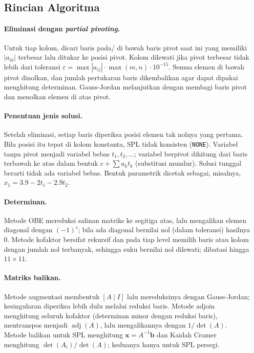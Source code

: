 \documentclass[12pt,a4paper]{article}
\newcommand{\mat}[1]{\mathbf{#1}}
\DeclareMathOperator{\adj}{adj}
\begin{document}
\subsection{Rincian Algoritma}

\paragraph{Eliminasi dengan \textit{partial pivoting}.} Untuk tiap kolom, dicari baris pada/ di bawah baris pivot saat ini yang memiliki $|a_{ik}|$ terbesar lalu ditukar ke posisi pivot. Kolom dilewati jika pivot terbesar tidak lebih dari toleransi $\varepsilon=\max|a_{ij}|\cdot\max(m,n)\cdot10^{-15}$. Semua elemen di bawah pivot dinolkan, dan jumlah pertukaran baris dikembalikan agar dapat dipakai menghitung determinan. Gauss-Jordan melanjutkan dengan membagi baris pivot dan menolkan elemen di atas pivot.

\paragraph{Penentuan jenis solusi.} Setelah eliminasi, setiap baris diperiksa posisi elemen tak nolnya yang pertama. Bila posisi itu tepat di kolom konstanta, SPL tidak konsisten (\texttt{NONE}). Variabel tanpa pivot menjadi variabel bebas $t_1,t_2,\dots$; variabel berpivot dihitung dari baris terbawah ke atas dalam bentuk $c+\sum a_kt_k$ (substitusi mundur). Solusi tunggal berarti tidak ada variabel bebas. Bentuk parametrik dicetak sebagai, misalnya, $x_1 = 3.9 - 2t_1 - 2.9t_2$.

\paragraph{Determinan.} Metode OBE mereduksi salinan matriks ke segitiga atas, lalu mengalikan elemen diagonal dengan $(-1)^s$; bila ada diagonal bernilai nol (dalam toleransi) hasilnya $0$. Metode kofaktor bersifat rekursif dan pada tiap level memilih baris atau kolom dengan jumlah nol terbanyak, sehingga suku bernilai nol dilewati; dibatasi hingga $11\times11$.

\paragraph{Matriks balikan.} Metode augmentasi membentuk $[A\mid I]$ lalu mereduksinya dengan Gauss-Jordan; kesingularan diperiksa lebih dulu melalui reduksi baris. Metode adjoin menghitung seluruh kofaktor (determinan minor dengan reduksi baris), mentranspos menjadi $\adj(A)$, lalu mengalikannya dengan $1/\det(A)$. Metode balikan untuk SPL menghitung $\mat{x}=A^{-1}\mat{b}$ dan Kaidah Cramer menghitung $\det(A_i)/\det(A)$; keduanya hanya untuk SPL persegi.
\end{document}

